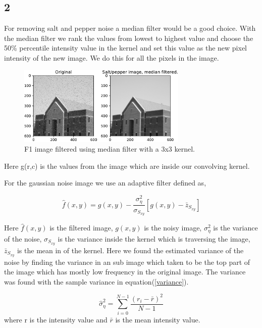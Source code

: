 {\subsection{2}

For removing salt and pepper noise a median filter would be a good choice. With the median filter we rank the values from lowest to highest value and choose the 50\% percentile intensity value in the kernel and set this value as the new pixel intensity of the new image. We do this for all the pixels in the image.


\begin{figure}[!htb]
    {\centering
        \includegraphics[width=0.72\textwidth]{Filtered_saltimage.pdf}
        \caption{F1 image filtered using median filter with a 3x3 kernel.}
        \label{salt}
    \par}
    \end{figure}
Here g(r,c) is the values from the image which are inside our convolving kernel.

For the gaussian noise image we use an adaptive filter defined as,

\begin{equation}
    \hat{f}(x,y) = g(x,y) - \frac{\sigma^{2}_{\eta}}{\sigma_{S_{xy}}}\left[g(x,y) - \bar{z}_{S_{xy}}\right]
    \label{adaptive}
\end{equation}

Here $\hat{f}(x,y)$ is the filtered image, $g(x,y)$ is the noisy image, $\sigma^{2}_{\eta}$ is the variance of the noise, $\sigma_{S_{xy}}$ is the variance inside the kernel which is traversing the image, $\bar{z}_{S_{xy}}$ is the mean in of the kernel. Here we found the estimated variance of the noise by finding the variance in an sub image which taken to be the top part of the image which has mostly low frequency in the original image. The variance was found with the sample variance in equation(\ref{variance}).

\begin{equation}
    \hat{\sigma}^{2}_{\eta} = \sum_{i = 0}^{N-1}\frac{(r_{i} - \bar{r})^{2}}{N-1}
    \label{variance}
\end{equation}
where r is the intensity value and $\bar{r}$ is the mean intensity value.


}
